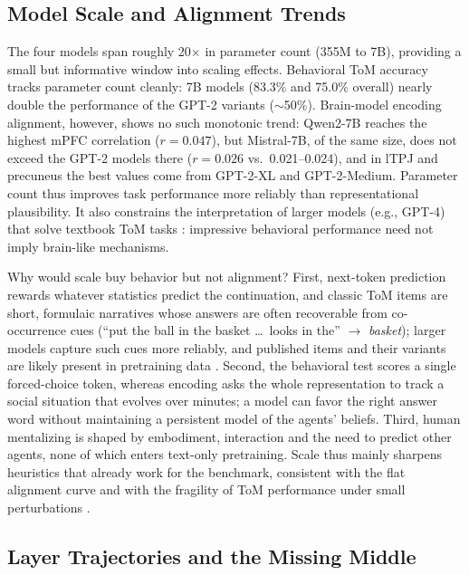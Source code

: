 \documentclass[conference]{IEEEtran}
\begin{document}
\subsection{Model Scale and Alignment Trends}

The four models span roughly 20$\times$ in parameter count (355M to 7B), providing a small but informative window into scaling effects. Behavioral ToM accuracy tracks parameter count cleanly: 7B models (83.3\% and 75.0\% overall) nearly double the performance of the GPT-2 variants ($\sim$50\%). Brain-model encoding alignment, however, shows no such monotonic trend: Qwen2-7B reaches the highest mPFC correlation ($r = 0.047$), but Mistral-7B, of the same size, does not exceed the GPT-2 models there ($r = 0.026$ vs.\ 0.021--0.024), and in lTPJ and precuneus the best values come from GPT-2-XL and GPT-2-Medium. Parameter count thus improves task performance more reliably than representational plausibility. It also constrains the interpretation of larger models (e.g., GPT-4) that solve textbook ToM tasks \cite{kosinski2024evaluating, strachan2024testing}: impressive behavioral performance need not imply brain-like mechanisms.

Why would scale buy behavior but not alignment? First, next-token prediction rewards whatever statistics predict the continuation, and classic ToM items are short, formulaic narratives whose answers are often recoverable from co-occurrence cues (``put the ball in the basket \ldots\ looks in the'' $\rightarrow$ \emph{basket}); larger models capture such cues more reliably, and published items and their variants are likely present in pretraining data \cite{ullman2023large, shapira2024clever}. Second, the behavioral test scores a single forced-choice token, whereas encoding asks the whole representation to track a social situation that evolves over minutes; a model can favor the right answer word without maintaining a persistent model of the agents' beliefs. Third, human mentalizing is shaped by embodiment, interaction and the need to predict other agents, none of which enters text-only pretraining. Scale thus mainly sharpens heuristics that already work for the benchmark, consistent with the flat alignment curve and with the fragility of ToM performance under small perturbations \cite{ullman2023large}.

\subsection{Layer Trajectories and the Missing Middle}
\end{document}
